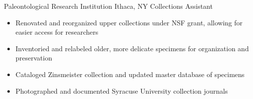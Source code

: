 
        {Paleontological Research Institution}
        {Ithaca, NY}
        {Collections Assistant}
        {}{
    \begin{itemize}
        \item Renovated and reorganized upper collections under NSF grant, allowing for easier access for researchers
        \item Inventoried and relabeled older, more delicate specimens for organization and preservation
        \item Cataloged Zinsmeister collection and updated master database of specimens
        \item Photographed and documented Syracuse University collection journals
    \end{itemize}
}

